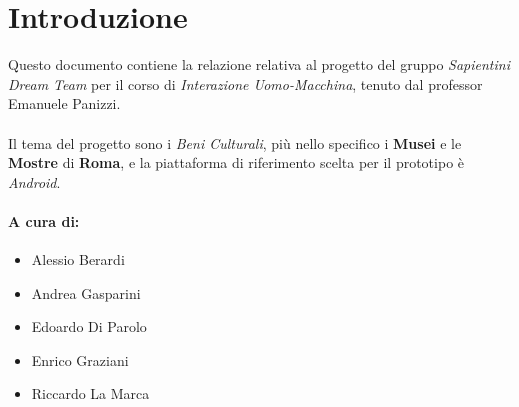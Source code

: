 \section{Introduzione}

Questo documento contiene la relazione relativa al progetto del gruppo \textit{Sapientini Dream Team} per il corso di \textit{Interazione Uomo-Macchina}, tenuto dal professor Emanuele Panizzi.

\paragraph{}
Il tema del progetto sono i \textit{Beni Culturali}, più nello specifico i \textbf{Musei} e le \textbf{Mostre} di \textbf{Roma}, e la piattaforma di riferimento scelta per il prototipo è \textit{Android}. 

\paragraph{A cura di:}
\begin{itemize}
    \item Alessio Berardi
    \item Andrea Gasparini
    \item Edoardo Di Parolo
    \item Enrico Graziani
    \item Riccardo La Marca
\end{itemize}